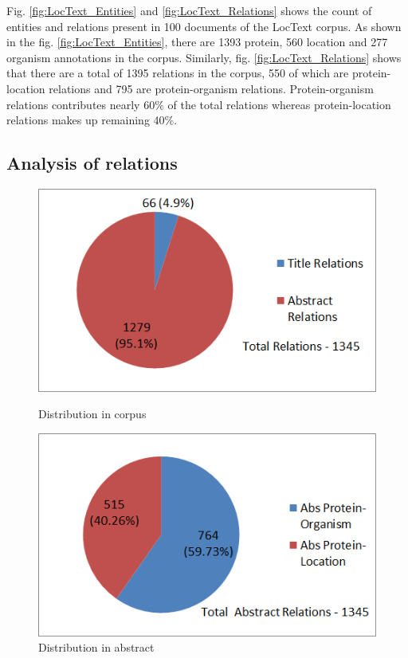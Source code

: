 Fig. \ref{fig:LocText_Entities} and \ref{fig:LocText_Relations} shows the count of entities and relations present in 100 documents of the LocText corpus. As shown in the fig. \ref{fig:LocText_Entities}, there are 1393 protein, 560 location and 277 organism annotations in the corpus. Similarly, fig. \ref{fig:LocText_Relations} shows that there are a total of 1395 relations in the corpus, 550 of which are protein-location relations and 795 are protein-organism relations. Protein-organism relations contributes nearly 60\% of the total relations whereas protein-location relations makes up remaining 40\%.

\subsection*{Analysis of relations}

\begin{figure}
\centering
\begin{minipage}{.5\textwidth}
  \centering
  \includegraphics[width=.95\textwidth]{figures/Rel_Title_Abs_Distribution.png}
  \caption{Distribution in corpus}
  \label{fig:Rel_Title_Abs}
\end{minipage}%
\begin{minipage}{.5\textwidth}
  \centering
  \includegraphics[width=.95\textwidth]{figures/AbsRel_PO_PL_Distribution.png}
  \caption{Distribution in abstract}
  \label{fig:Rel_Abs_PO_PL}
\end{minipage}
\end{figure}

